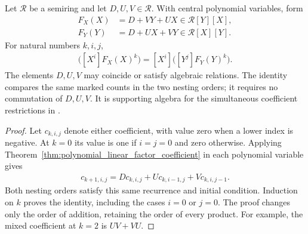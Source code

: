\begin{theorem}
    \label{thm:polynomial_two_marker_power}
    \leanok
    Let $\mathcal R$ be a semiring and let $D,U,V\in\mathcal R$.
    With central polynomial variables, form
    \begin{align*}
        F_X(X)&=D+VY+UX\in\mathcal R[Y][X], \\
        F_Y(Y)&=D+UX+VY\in\mathcal R[X][Y].
    \end{align*}
    For natural numbers $k,i,j$,
    \begin{align*}
        [Y^j]\bigl([X^i]F_X(X)^k\bigr)
            =[X^i]\bigl([Y^j]F_Y(Y)^k\bigr).
    \end{align*}
    The elements $D,U,V$ may coincide or satisfy algebraic relations.
    The identity compares the same marked counts in the two nesting orders;
    it requires no commutation of $D,U,V$.
    It is supporting algebra for the simultaneous coefficient restrictions in
    \cite[Proposition~5.7]{Arad2016RigorousRG}.
\end{theorem}
\begin{proof}
    \leanok
    Let $c_{k,i,j}$ denote either coefficient, with value zero when a lower
    index is negative. At $k=0$ its value is one if $i=j=0$ and zero otherwise.
    Applying Theorem~\ref{thm:polynomial_linear_factor_coefficient} in each
    polynomial variable gives
    \begin{align*}
        c_{k+1,i,j}
            =Dc_{k,i,j}+Uc_{k,i-1,j}+Vc_{k,i,j-1}.
    \end{align*}
    Both nesting orders satisfy this same recurrence and initial condition.
    Induction on $k$ proves the identity, including the cases $i=0$ or $j=0$.
    The proof changes only the order of addition, retaining the order of every
    product. For example, the mixed coefficient at $k=2$ is $UV+VU$.
\end{proof}



